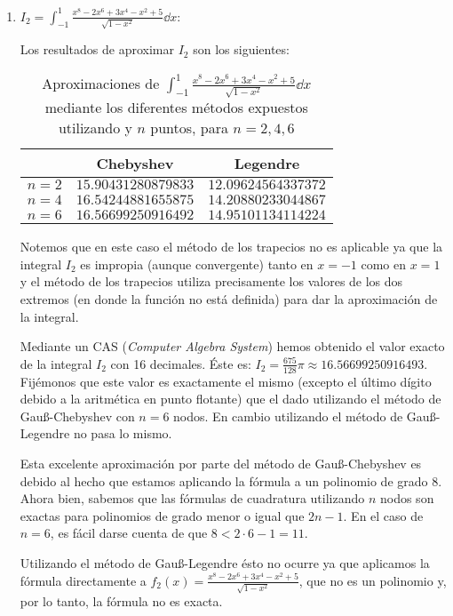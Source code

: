 \documentclass[a4paper]{article}
\begin{document}
\begin{enumerate}
    \item $\displaystyle I_2=\int_{-1}^1\frac{x^8-2x^6+3x^4-x^2+5}{\sqrt{1-x^2}}\dd x$:\par
    Los resultados de aproximar $I_2$ son los siguientes:
    \begin{table}[ht]
        \centering
        \captionsetup{width=0.9\textwidth}
        \begin{tabular}{|c|c|c|}
            \cline{2-3}
            \multicolumn{1}{c|}{} & Chebyshev & Legendre \\
            \hline
            $n=2$ & $15.90431280879833$ & $12.09624564337372$ \\
            \hline
            $n=4$ & $16.54244881655875$ & $14.20880233044867$ \\
            \hline
            $n=6$ & $16.56699250916492$ & $14.95101134114224$ \\
            \hline
        \end{tabular}
        \caption{Aproximaciones de $\int_{-1}^1\frac{x^8-2x^6+3x^4-x^2+5}{\sqrt{1-x^2}}\dd x$ mediante los diferentes métodos expuestos u\-ti\-li\-zan\-do y $n$ puntos, para $n=2,4,6$}
    \end{table}\par
    Notemos que en este caso el método de los trapecios no es aplicable ya que la integral $I_2$ es impropia (aunque convergente) tanto en $x=-1$ como en $x=1$ y el método de los trapecios utiliza precisamente los valores de los dos extremos (en donde la función no está definida) para dar la aproximación de la integral.\par
    Mediante un CAS (\textit{Computer Algebra System}) hemos obtenido el valor exacto de la integral $I_2$ con 16 decimales. Éste es: $I_2=\frac{675}{128}\pi\approx 16.56699250916493$. Fijémonos que este valor es exactamente el mismo (excepto el último dígito debido a la aritmética en punto flotante) que el dado utilizando el método de Gau\ss-Chebyshev con $n=6$ nodos. En cambio utilizando el método de Gau\ss-Legendre no pasa lo mismo.\par
    Esta excelente aproximación por parte del método de Gau\ss-Chebyshev es debido al hecho que estamos aplicando la fórmula a un polinomio de grado 8. Ahora bien, sabemos que las fórmulas de cuadratura utilizando $n$ nodos son exactas para polinomios de grado menor o igual que $2n-1$. En el caso de $n=6$, es fácil darse cuenta de que $8<2\cdot 6-1=11$.\par Utilizando el método de Gau\ss-Legendre ésto no ocurre ya que aplicamos la fórmula directamente a $f_2(x)=\frac{x^8-2x^6+3x^4-x^2+5}{\sqrt{1-x^2}}$, que no es un polinomio y, por lo tanto, la fórmula no es exacta.

\end{enumerate}
\end{document}
